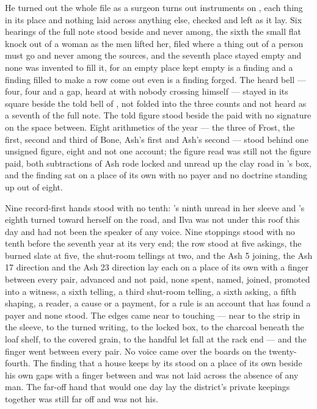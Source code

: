 He turned out the whole file as a surgeon turns out instruments on , each thing in its place and nothing laid across anything else, checked and left as it lay. Six hearings of the full note stood beside and never among, the sixth the small flat knock out of a woman as the men lifted her, filed where a thing out of a person must go and never among the sources, and the seventh place stayed empty and none was invented to fill it, for an empty place kept empty is a finding and a finding filled to make a row come out even is a finding forged. The heard bell --- four, four and a gap, heard at  with nobody crossing himself --- stayed in its square beside the told bell of , not folded into the three counts and not heard as a seventh of the full note. The told figure stood beside the paid with no signature on the space between. Eight arithmetics of the year --- the three of Frost, the first, second and third of Bone, Ash’s first and Ash’s second --- stood behind one unsigned figure, eight and not one account; the figure read was still not the figure paid, both subtractions of Ash rode locked and unread up the clay road in ’s box, and the finding sat on a place of its own with no payer and no doctrine standing up out of eight.

Nine record-first hands stood with no tenth: ’s ninth unread in her sleeve and ’s eighth turned toward herself on the road, and Ilva was not under this roof this day and had not been the speaker of any voice. Nine stoppings stood with no tenth before the seventh year at its very end; the row stood at five askings, the burned slate at five, the shut-room tellings at two, and the Ash 5 joining, the Ash 17 direction and the Ash 23 direction lay each on a place of its own with a finger between every pair, advanced and not paid, none spent, named, joined, promoted into a witness, a sixth telling, a third shut-room telling, a sixth asking, a fifth shaping, a reader, a cause or a payment, for a rule is an account that has found a payer and none stood. The edges came near to touching --- near to the strip in the sleeve, to the turned writing, to the locked box, to the charcoal beneath the loaf shelf, to the covered grain, to the handful let fall at the rack end --- and the finger went between every pair. No voice came over the boards on the twenty-fourth. The finding that a house keeps by its  stood on a place of its own beside his own gaps with a finger between and was not laid across the absence of any man. The far-off hand that would one day lay the district’s private keepings together was still far off and was not his.

